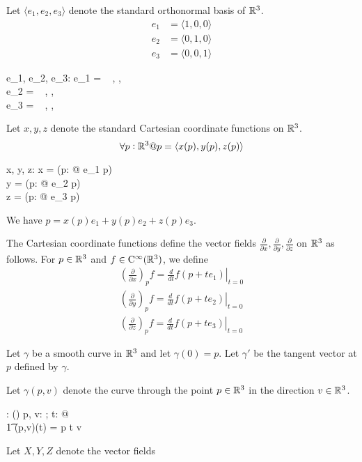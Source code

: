 \documentclass[11pt, oneside]{article}
\begin{document}
Let $\langle e_1, e_2, e_3 \rangle$ denote the standard orthonormal basis of $\mathbb{R}^3$.
\begin{align}
e_1 & = \langle1, 0, 0 \rangle \\
e_2 & = \langle 0, 1, 0 \rangle \\
e_3 & = \langle 0, 0, 1 \rangle
\end{align}
\begin{axdef}
	e_1, e_2, e_3: \Rthree
\where
	e_1 = \langle~ \oneR, \zeroR, \zeroR ~\rangle \\
	e_2 = \langle~ \zeroR, \oneR, \zeroR ~\rangle \\
	e_3 = \langle~ \zeroR, \zeroR, \oneR ~\rangle
\end{axdef}

Let $x, y, z$ denote the standard Cartesian coordinate functions on $\mathbb{R}^3$.
\begin{equation}
\forall p : \mathbb{R}^3 @ p = \langle x(p), y(p), z(p) \rangle
\end{equation}
\begin{axdef}
	x, y, z: \Rthree \fun \R
\where
	x = (\lambda p: \Rthree @ e_1 \dotR p) \\
	y = (\lambda p: \Rthree @ e_2 \dotR p) \\
	z = (\lambda p: \Rthree @ e_3 \dotR p)
\end{axdef}
\begin{remark}
We have $p = x(p) e_1 + y(p) e_2 + z(p) e_3$.
\end{remark}

The Cartesian coordinate functions define the vector fields $\frac{\partial}{\partial x}, \frac{\partial}{\partial y}, \frac{\partial}{\partial z}$
on $\mathbb{R}^3$ as follows. 
For $p \in \mathbb{R}^3$ and $f \in \operatorname{C^{\infty}}(\mathbb{R}^3)$, we define
\begin{align}
\left(\frac{\partial}{\partial x}\right)_p f = \left. \frac{d}{dt} f(p + t e_1) \right|_{t = 0} \\
\left(\frac{\partial}{\partial y}\right)_p f = \left. \frac{d}{dt} f(p + t e_2) \right|_{t = 0} \\
\left(\frac{\partial}{\partial z}\right)_p f = \left. \frac{d}{dt} f(p + t e_3) \right|_{t = 0}
\end{align}

Let $\gamma$ be a smooth curve in $\mathbb{R}^3$ and let $\gamma(0) = p$.
Let $\gamma'$ be the tangent vector at $p$ defined by $\gamma$.

Let $\gamma(p,v)$ denote the curve through the point $p \in \mathbb{R}^3$ in the direction $v \in \mathbb{R}^3$.
\begin{axdef}
	\gamma: \Rthree \cross \Rthree \fun (\R \fun \Rthree)
\where
	\forall p, v: \Rthree; t: \R @ \\
	\t1	\gamma(p,v)(t) = p \vaddR t \smulR v
\end{axdef}

Let $X, Y, Z$ denote the vector fields

\printbibliography
\end{document}
